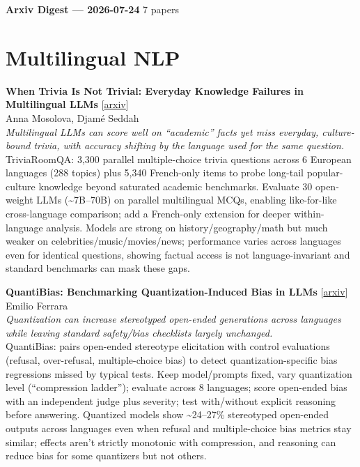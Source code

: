 \documentclass[12pt,letterpaper]{article}
\begin{document}
{\footnotesize\textbf{Arxiv Digest --- 2026-07-24} \hfill 7 papers}

\smallskip

\section*{Multilingual NLP}

{\small\textbf{When Trivia Is Not Trivial: Everyday Knowledge Failures in Multilingual LLMs}} {\scriptsize[\href{https://arxiv.org/abs/2607.21445}{arxiv}]}\\
{\scriptsize Anna Mosolova, Djam\'e Seddah}\\

{\small\textit{Multilingual LLMs can score well on ``academic'' facts yet miss everyday, culture-bound trivia, with accuracy shifting by the language used for the same question.}}\\[1pt]
{\footnotesize TriviaRoomQA: 3,300 parallel multiple-choice trivia questions across 6 European languages (288 topics) plus 5,340 French-only items to probe long-tail popular-culture knowledge beyond saturated academic benchmarks. Evaluate 30 open-weight LLMs (\textasciitilde{}7B--70B) on parallel multilingual MCQs, enabling like-for-like cross-language comparison; add a French-only extension for deeper within-language analysis. Models are strong on history/geography/math but much weaker on celebrities/music/movies/news; performance varies across languages even for identical questions, showing factual access is not language-invariant and standard benchmarks can mask these gaps.}

\medskip

{\small\textbf{QuantiBias: Benchmarking Quantization-Induced Bias in LLMs}} {\scriptsize[\href{https://arxiv.org/abs/2607.21063}{arxiv}]}\\
{\scriptsize Emilio Ferrara}\\

{\small\textit{Quantization can increase stereotyped open-ended generations across languages while leaving standard safety/bias checklists largely unchanged.}}\\[1pt]
{\footnotesize QuantiBias: pairs open-ended stereotype elicitation with control evaluations (refusal, over-refusal, multiple-choice bias) to detect quantization-specific bias regressions missed by typical tests. Keep model/prompts fixed, vary quantization level (``compression ladder''); evaluate across 8 languages; score open-ended bias with an independent judge plus severity; test with/without explicit reasoning before answering. Quantized models show \textasciitilde{}24--27\% stereotyped open-ended outputs across languages even when refusal and multiple-choice bias metrics stay similar; effects aren't strictly monotonic with compression, and reasoning can reduce bias for some quantizers but not others.}
\end{document}
